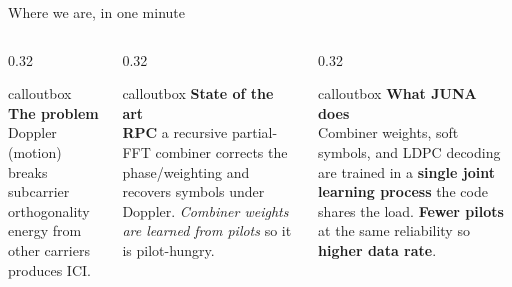 \documentclass[aspectratio=169,10pt]{beamer}
\begin{document}
\begin{frame}{Where we are, in one minute}
  \vspace{0.1cm}
  \begin{columns}[T,onlytextwidth]
    \begin{column}{0.32\textwidth}
      \begin{beamercolorbox}[wd=\linewidth,sep=6pt,rounded=true]{calloutbox}
        \textbf{\color{rpc} The problem}\\[0.2em]
        \scriptsize Doppler (motion) breaks subcarrier orthogonality \textendash{} energy from other carriers produces ICI.
      \end{beamercolorbox}
    \end{column}
    \begin{column}{0.32\textwidth}
      \begin{beamercolorbox}[wd=\linewidth,sep=6pt,rounded=true]{calloutbox}
        \textbf{\color{accent} State of the art}\\[0.2em]
        \scriptsize \textbf{RPC} \textendash{} a recursive partial-FFT combiner \textendash{} corrects the phase/weighting and recovers symbols under Doppler. \emph{Combiner weights are learned from pilots} \textendash{} so it is pilot-hungry.
      \end{beamercolorbox}
    \end{column}
    \begin{column}{0.32\textwidth}
      \begin{beamercolorbox}[wd=\linewidth,sep=6pt,rounded=true]{calloutbox}
        \textbf{\color{juna} What JUNA does}\\[0.2em]
        \scriptsize Combiner weights, soft symbols, and LDPC decoding are trained in a \textbf{single joint learning process} \textendash{} the code shares the load. \textbf{Fewer pilots} at the same reliability \textendash{} so \textbf{higher data rate}.
      \end{beamercolorbox}
    \end{column}
  \end{columns}


\end{frame}
\end{document}
